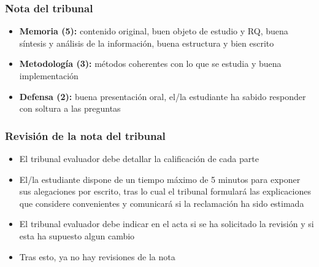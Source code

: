 \documentclass[aspectratio=43]{beamer}
\begin{document}
\begin{frame}
\frametitle{Nota del tribunal}
\centering

\begin{itemize}
  \item \textbf{Memoria (5):} contenido original, buen objeto de estudio y RQ, buena síntesis y análisis de la información, buena estructura y bien escrito
  \item \textbf{Metodología (3):} métodos coherentes con lo que se estudia y buena implementación
  \item \textbf{Defensa (2):} buena presentación oral, el/la estudiante ha sabido responder con soltura a las preguntas
\end{itemize}

\end{frame}

\begin{frame}
\frametitle{Revisión de la nota del tribunal}
\centering

\begin{itemize}
  \item El tribunal evaluador debe detallar la calificación de cada parte
  \item El/la estudiante dispone de un tiempo máximo de 5 minutos
  para exponer sus alegaciones por escrito, tras lo cual el tribunal formulará las
  explicaciones que considere convenientes y comunicará si la
  reclamación ha sido estimada
  \item El tribunal evaluador debe indicar en el acta si se ha solicitado la revisión y si esta ha supuesto algun cambio
  \item Tras esto, ya no hay revisiones de la nota
\end{itemize}

\end{frame}
\end{document}
